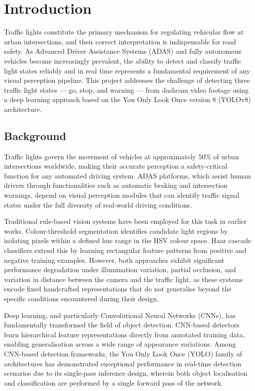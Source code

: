 \chapter{Introduction}

Traffic lights constitute the primary mechanism for regulating vehicular flow at urban intersections, and their correct interpretation is indispensable for road safety. As Advanced Driver Assistance Systems (ADAS) and fully autonomous vehicles become increasingly prevalent, the ability to detect and classify traffic light states reliably and in real time represents a fundamental requirement of any visual perception pipeline. This project addresses the challenge of detecting three traffic light states — go, stop, and warning — from dashcam video footage using a deep learning approach based on the You Only Look Once version 8 (YOLOv8) architecture.

\section{Background}

Traffic lights govern the movement of vehicles at approximately 50\% of urban intersections worldwide, making their accurate perception a safety-critical function for any automated driving system. ADAS platforms, which assist human drivers through functionalities such as automatic braking and intersection warnings, depend on visual perception modules that can identify traffic signal states under the full diversity of real-world driving conditions.

Traditional rule-based vision systems have been employed for this task in earlier works. Colour-threshold segmentation identifies candidate light regions by isolating pixels within a defined hue range in the HSV colour space. Haar cascade classifiers extend this by learning rectangular feature patterns from positive and negative training examples. However, both approaches exhibit significant performance degradation under illumination variation, partial occlusion, and variation in distance between the camera and the traffic light, as these systems encode fixed handcrafted representations that do not generalise beyond the specific conditions encountered during their design.

Deep learning, and particularly Convolutional Neural Networks (CNNs), has fundamentally transformed the field of object detection. CNN-based detectors learn hierarchical feature representations directly from annotated training data, enabling generalisation across a wide range of appearance variations. Among CNN-based detection frameworks, the You Only Look Once (YOLO) family of architectures has demonstrated exceptional performance in real-time detection scenarios due to its single-pass inference design, wherein both object localisation and classification are performed by a single forward pass of the network.

